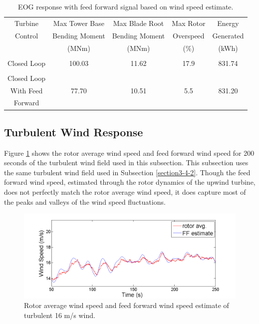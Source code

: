 \begin{table}
\centering
\begin{tabular}{ c | c c c c }
\hline
\hline
Turbine			& Max Tower	Base		& Max Blade	Root		& Max Rotor				& Energy\\
Control			& Bending Moment		& Bending Moment		& Overspeed					& Generated\\
						& (MNm)  				& (MNm)				& ($\%$)	& (kWh)\\

\hline
  &  &   &  &  \\
Closed Loop  & 100.03 & 11.62  &17.9 & 831.74 \\
 &  &   &  & \\
Closed Loop  &  &   &  &  \\
With Feed  & 77.70 & 10.51  & 5.5 & 831.20 \\
Forward  &  &   &  &  \\
\hline
\hline
\end{tabular}
\caption{EOG response with feed forward signal based on wind speed estimate.}
\label{Table3-4}
\end{table}

\subsection{Turbulent Wind Response} \label{section3-5-2}
Figure \ref{fig3-30} shows the rotor average wind speed and feed forward wind speed for 200 seconds of the turbulent wind field used in this subsection. This subsection uses the same turbulent wind field used in Subsection \ref{section3-4-2}. Though the feed forward wind speed, estimated through the rotor dynamics of the upwind turbine, does not perfectly match the rotor average wind speed, it does capture most of the peaks and valleys of the wind speed fluctuations. 

\begin{figure}[htbp]
	\centering
		\includegraphics[width = \linewidth]{Figures/ch3Figures/fig3-30.png}
		
	\caption{Rotor average wind speed and feed forward wind speed estimate of turbulent 16 m/s wind.}
	\label{fig3-30}
\end{figure}

